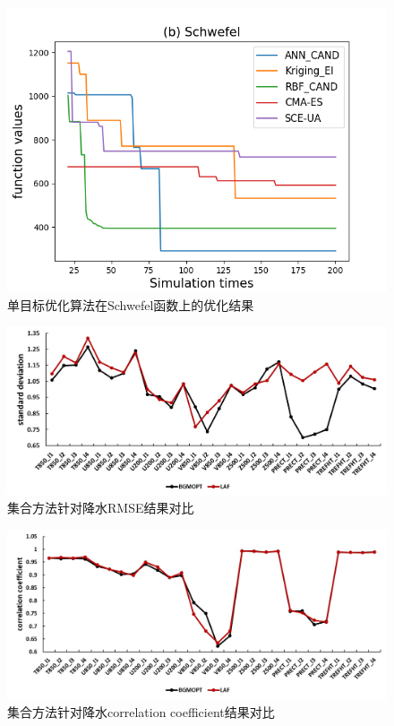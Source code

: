 \begin{figure}[H] %
  \centering
  \includegraphics[scale=0.6]{figures/all_schw4.png}
  \caption{单目标优化算法在Schwefel函数上的优化结果}
  \label{fig:xfig1}
\end{figure} 

\begin{figure}[H] %
\label{prectresult}
  \centering
  \includegraphics[scale=0.6]{figures/allvar-std.jpg}
  \caption{集合方法针对降水RMSE结果对比}
  \label{fig:xfig1}
\end{figure} 

\begin{figure}[H] %
\label{prectresult}
  \centering
  \includegraphics[scale=0.6]{figures/allvar_coef.jpg}
  \caption{集合方法针对降水correlation coefficient结果对比}
  \label{fig:xfig1}
\end{figure} 

